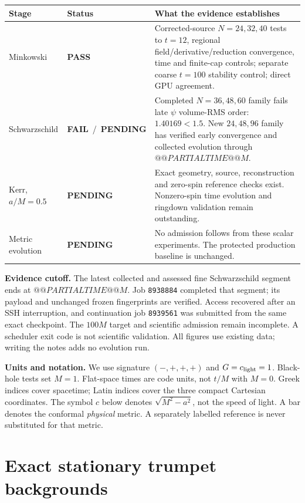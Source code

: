 \documentclass[11pt,letterpaper]{article}
\newcommand{\pass}{\textcolor{good}{\textbf{PASS}}}
\newcommand{\fail}{\textcolor{bad}{\textbf{FAIL}}}
\newcommand{\pending}{\textcolor{muted}{\textbf{PENDING}}}
\begin{document}
\begin{center}\small
\begin{tabularx}{\linewidth}{@{}p{2.8cm}p{2.3cm}X@{}}\toprule
Stage & Status & What the evidence establishes \\\midrule
Minkowski & \pass & Corrected-source $N=24,32,40$ tests to $t=12$, regional field/derivative/reduction convergence, time and finite-cap controls; separate coarse $t=100$ stability control; direct GPU agreement. \\
Schwarzschild & \fail\ /\ \pending & Completed $N=36,48,60$ family fails late $\psi$ volume-RMS order: $1.40169<1.5$. New $24,48,96$ family has verified early convergence and collected evolution through $@@PARTIALTIME@@M$. \\
Kerr, $a/M=0.5$ & \pending & Exact geometry, source, reconstruction and zero-spin reference checks exist. Nonzero-spin time evolution and ringdown validation remain outstanding. \\
Metric evolution & \pending & No admission follows from these scalar experiments. The protected production baseline is unchanged. \\\bottomrule
\end{tabularx}
\end{center}

\textbf{Evidence cutoff.} The latest collected and assessed fine Schwarzschild segment ends at $@@PARTIALTIME@@M$. Job \texttt{8938884} completed that segment; its payload and unchanged frozen fingerprints are verified. Access recovered after an SSH interruption, and continuation job \texttt{8939561} was submitted from the same exact checkpoint. The $100M$ target and scientific admission remain incomplete. A scheduler exit code is not scientific validation. All figures use existing data; writing the notes adds no evolution run.

\textbf{Units and notation.} We use signature $(-,+,+,+)$ and $G=c_{\rm light}=1$. Black-hole tests set $M=1$. Flat-space times are code units, not $t/M$ with $M=0$. Greek indices cover spacetime; Latin indices cover the three compact Cartesian coordinates. The symbol $c$ below denotes $\sqrt{M^2-a^2}$, not the speed of light. A bar denotes the conformal \emph{physical} metric. A separately labelled reference is never substituted for that metric.

\clearpage
\section{Exact stationary trumpet backgrounds}
\end{document}
